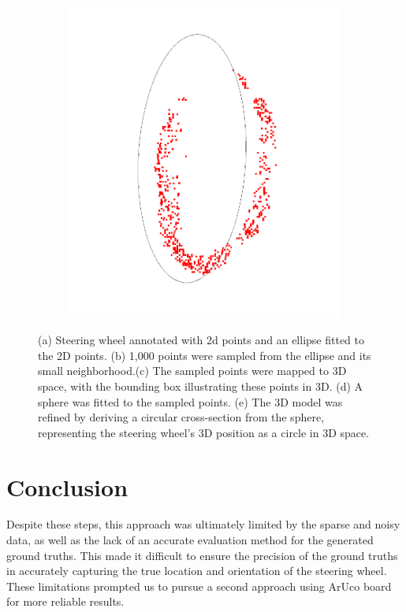 \begin{figure}[ht]
\begin{subfigure}[t]{0.18\textwidth}
        \caption{}
        \label{fig:sphere}
    \end{subfigure}\hfill
    \begin{subfigure}[t]{0.18\textwidth}
        \centering
        \includegraphics[width=\textwidth]{media/chapter 4/circl.png}
        \caption{}
        \label{fig:circle}
    \end{subfigure}\hfill
    \caption{(a) Steering wheel annotated with 2d points 
    and an ellipse fitted to the 2D points. (b) 1,000 points were sampled from the ellipse 
    and its small neighborhood.(c) The sampled points were mapped to 3D space, 
    with the bounding box illustrating these points in 3D. 
    (d) A sphere was fitted to the sampled points. 
    (e) The 3D model was refined by deriving a 
    circular cross-section from the sphere, representing 
    the steering wheel’s 3D position as a circle in 
    3D space.}
\end{figure}


\section{Conclusion}
Despite these steps, this approach was ultimately limited by the sparse and noisy data, as well as the lack of an accurate evaluation method 
for the generated ground truths. This made it difficult to ensure the 
precision of the ground truths in accurately capturing the true location and orientation of the 
steering wheel. These limitations prompted us to pursue a second 
approach using ArUco board for more reliable results.

